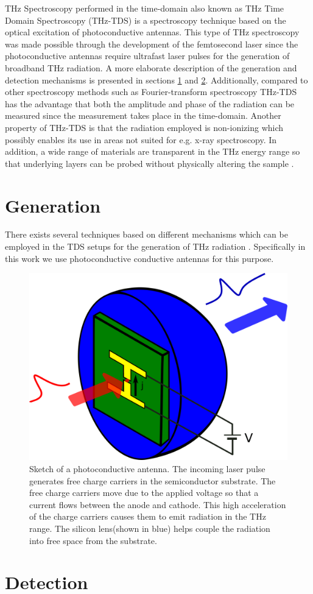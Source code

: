 THz Spectroscopy performed in the time-domain also known as THz Time Domain Spectroscopy (THz-TDS) is a spectroscopy technique based on the optical excitation of photoconductive antennas. This type of THz spectroscopy was made possible through the development of the femtosecond laser since the photoconductive antennas require ultrafast laser pulses for the generation of broadband THz radiation. A more elaborate description of the generation and detection mechanisms is presented in sections \ref{sec:thz-generation} and \ref{sec:thz-detection}. Additionally, compared to other spectroscopy methods such as Fourier-transform spectroscopy THz-TDS has the advantage that both the amplitude and phase of the radiation can be measured since the measurement takes place in the time-domain. Another property of THz-TDS is that the radiation employed is non-ionizing which possibly enables its use in areas not suited for e.g. x-ray spectroscopy. In addition, a wide range of materials are transparent in the THz energy range so that underlying layers can be probed without physically altering the sample \cite{Horlick68, Jepsen2011}.

\section{Generation}
\label{sec:thz-generation}
There exists several techniques based on different mechanisms which can be employed in the TDS setups for the generation of THz radiation \cite{Jepsen2011}. Specifically in this work we use photoconductive conductive antennas for this purpose. 

\begin{figure}[H]
    \centering
    \includegraphics[scale=0.5]{images/2_chapter02/PCA.png}
    \caption{Sketch of a photoconductive antenna. The incoming laser pulse generates free charge carriers in the semiconductor substrate. The free charge carriers move due to the applied voltage so that a current flows between the anode and cathode. This high acceleration of the charge carriers causes them to emit radiation in the THz range. The silicon lens(shown in blue) helps couple the radiation into free space from the substrate.}
    \label{fig:PCA}
\end{figure}

\section{Detection}
\label{sec:thz-detection}
